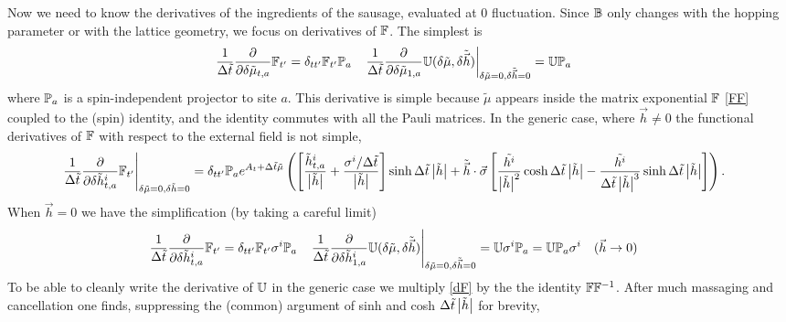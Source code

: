 Now we need to know the derivatives of the ingredients of the sausage, evaluated at 0 fluctuation.
Since $\mathbb{B}$ only changes with the hopping parameter or with the lattice geometry, we focus on derivatives of $\mathbb{F}$.
The simplest is
\begin{align}
	\frac{1}{\Delta\tilde{t}} \frac{\partial}{\partial \delta\tilde{\mu}_{t,a}} \mathbb{F}_{t'} &= \delta_{tt'} \mathbb{F}_{t'} \mathbb{P}_a
	&
	\left.\frac{1}{\Delta\tilde{t}} \frac{\partial}{\partial \delta\tilde{\mu}_{1,a}} \mathbb{U}(\delta\tilde{\mu}, \delta\tilde{\vec{h}})\right|_{\delta\tilde{\mu}=0, \delta\tilde{\vec{h}}=0}
	&= \mathbb{U} \mathbb{P}_a
\end{align}
where $\mathbb{P}_a$ is a spin-independent projector to site $a$.
This derivative is simple because $\tilde{\mu}$ appears inside the matrix exponential $\mathbb{F}$ \eqref{FF} coupled to the (spin) identity, and the identity commutes with all the Pauli matrices.
In the generic case, where $\vec{h}\neq0$ the functional derivatives of $\mathbb{F}$ with respect to the external field is not simple,
\begin{align}
	\left.\frac{1}{\Delta\tilde{t}}\frac{\partial}{\partial \delta \tilde{h}^i_{t,a}} \mathbb{F}_{t'}\right|_{\delta\tilde{\mu} = 0, \delta \tilde{h}=0}
	&=
	\delta_{tt'}\mathbb{P}_a e^{A_t + \Delta\tilde{t}\tilde{\mu}}\left(
		\left[\frac{\tilde{h}^i_{t,a}}{\left| \tilde{h} \right|} + \frac{\sigma^i/\Delta\tilde{t}}{\left| \tilde{h} \right|}\right]\sinh \Delta\tilde{t}\left| \tilde{h} \right|
		+
		\tilde{\vec{h}}\cdot\vec{\sigma} \left[
				\frac{\tilde{h^i}}{\left| \tilde{h} \right|^2} \cosh \Delta\tilde{t} \left| \tilde{h} \right|
			-	\frac{\tilde{h^i}}{\Delta\tilde{t} \left| \tilde{h} \right|^{3}} \sinh \Delta\tilde{t} \left| \tilde{h} \right|
		\right]
	\right).
	\label{eq:dF}
\end{align}
When $\vec{h}=0$ we have the simplification (by taking a careful limit)
\begin{align}
	\frac{1}{\Delta\tilde{t}} \frac{\partial}{\partial \delta\tilde{h}^i_{t,a}} \mathbb{F}_{t'} &= \delta_{tt'} \mathbb{F}_{t'} \sigma^i \mathbb{P}_a
	&
	\left.\frac{1}{\Delta\tilde{t}} \frac{\partial}{\partial \delta\tilde{h}^i_{1,a}} \mathbb{U}(\delta\tilde{\mu}, \delta\tilde{\vec{h}})\right|_{\delta\tilde{\mu}=0, \delta\tilde{\vec{h}}=0}
	&= \mathbb{U} \sigma^i \mathbb{P}_a = \mathbb{U} \mathbb{P}_a \sigma^i 
	&
	(\vec{h} &\rightarrow 0)
	\label{eq:dFdh with h=0}
\end{align}
To be able to cleanly write the derivative of $\mathbb{U}$ in the generic case we multiply \eqref{dF} by the the identity $\mathbb{F}\mathbb{F}^{-1}$.
After much massaging and cancellation one finds, suppressing the (common) argument of sinh and cosh $\Delta\tilde{t}\left| \tilde{h} \right|$ for brevity,
